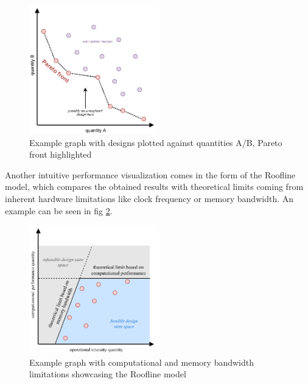\begin{figure}[hpt!]
  \centering
  \includegraphics[trim={0cm 0cm 0cm 0cm}, width=0.5\textwidth, center]{background/pareto.pdf}
  \caption{Example graph with designs plotted against quantities A/B, Pareto front highlighted}
  \label{fig:pareto}
\end{figure}

\pagebreak
Another intuitive performance visualization comes in the form of the Roofline model, which compares the obtained results with theoretical limits coming from inherent hardware limitations like clock frequency or memory bandwidth. An example can be seen in fig \ref{fig:roofline}.

\begin{figure}[hpt!]
  \centering
  \includegraphics[trim={0cm 0cm 0cm 0cm}, width=0.5\textwidth, center]{background/roofline.pdf}
  \caption{Example graph with computational and memory bandwidth limitations showcasing the Roofline model}
  \label{fig:roofline}
\end{figure}


